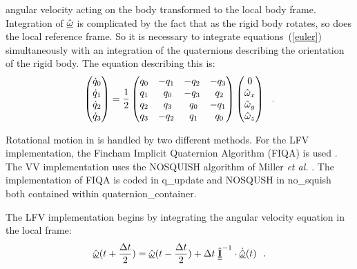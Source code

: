 angular velocity acting on the body transformed to the local body frame.
Integration of $\hat{\mbox{$\underline{\omega}$}}$ is complicated by the fact that as the
rigid body rotates, so does the local reference frame.  So it is necessary
to integrate equations~(\ref{euler}) simultaneously with an integration of
the quaternions describing the orientation of the rigid body.  The equation
describing this is:
\begin{equation}
\begin{pmatrix}
\dot{q}_0 \cr \dot{q}_1 \cr \dot{q}_2 \cr \dot{q}_3 \cr
\end{pmatrix}= {1 \over 2}
\begin{pmatrix}
q_0 & -q_1 & -q_2 & -q_3 \cr
q_1 & ~q_0 & -q_3 & ~q_2 \cr
q_2 & ~q_3 & ~q_0 & -q_1 \cr
q_3 & -q_2 & ~q_1 & ~q_0
\end{pmatrix}
\begin{pmatrix}
0 \cr \hat{\omega}_{x} \cr \hat{\omega}_{y} \cr \hat{\omega}_{z}
\end{pmatrix}~~.
\end{equation}

Rotational motion in \D is handled by two different methods.  For the LFV implementation,
the Fincham Implicit Quaternion Algorithm (FIQA) is used
\cite{fincham-92a}.  The VV implementation uses the NOSQUISH
algorithm of Miller {\em et al.} \cite{miller-02a}.  The implementation of FIQA is
coded in {\sc q\_update} and NOSQUSH in {\sc no\_squish} both contained within
{\sc quaternion\_container}.

The LFV implementation begins by integrating the angular velocity equation in the local frame:
\begin{equation}
\hat{\mbox{$\underline{\omega}$}}(t+{ \Delta t\over 2}) = \hat{\mbox{$\underline{\omega}$}}(t-{ \Delta t\over 2}) +
 \Delta t \; \hat{\mbox{$\underline{\underline{\bf I}}$}}^{-1} \cdot \dot{\hat{\mbox{$\underline{\omega}$}}}(t)~~.
\end{equation}

